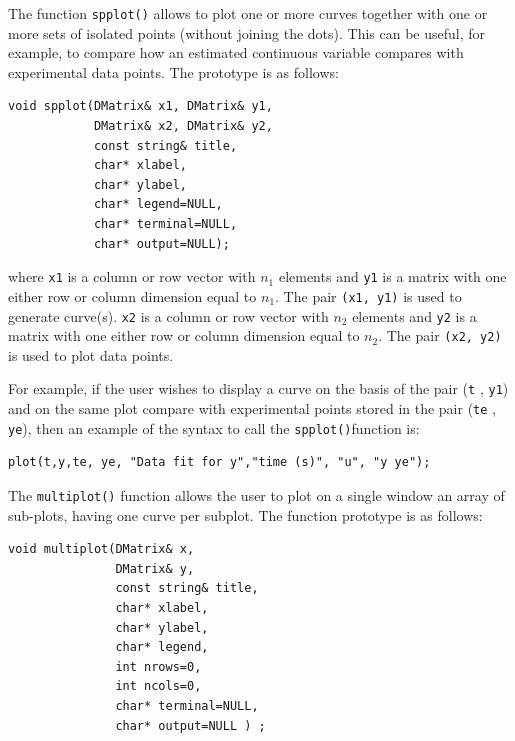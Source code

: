 \documentclass[a4paper,11pt]{report}    %
\newenvironment{shadedframe}{%
  \def\FrameCommand{\fcolorbox{black}{shadecolor}}%
  \MakeFramed {\FrameRestore}}
{\endMakeFramed}
\begin{document}
The function \texttt{spplot()} allows to plot one or more curves together with one or more sets of isolated points (without joining the dots). This can be useful, for example, to compare how an estimated continuous variable compares with experimental data points. The prototype is as follows:

\begin{verbatim}
void spplot(DMatrix& x1, DMatrix& y1,
            DMatrix& x2, DMatrix& y2,
            const string& title, 
            char* xlabel, 
            char* ylabel, 
            char* legend=NULL, 
            char* terminal=NULL, 
            char* output=NULL);
\end{verbatim}

\noindent where \texttt{x1} is a column or row vector with $n_1$ elements and \texttt{y1} is a matrix with 
one either row or column dimension equal to $n_1$. The pair \texttt{(x1, y1)} is used to generate curve(s). 
\texttt{x2} is a column or row vector with $n_2$ elements and \texttt{y2} is a matrix with 
one either row or column dimension equal to $n_2$. The pair \texttt{(x2, y2)} is used to plot data points.

\begin{shadedframe}

For example, if the user wishes to display a curve on the basis of the pair (\texttt{t} , \texttt{y1}) and on the same plot compare with experimental points stored in the pair (\texttt{te} , \texttt{ye}),  
then an example of the syntax to call the \texttt{spplot()}function is:

\begin{verbatim}
plot(t,y,te, ye, "Data fit for y","time (s)", "u", "y ye");
\end{verbatim}

\end{shadedframe}




The \texttt{multiplot()} function allows the user to plot on a single window an array of sub-plots, having
one curve per subplot. The function prototype is as follows:

\begin{verbatim}
void multiplot(DMatrix& x, 
               DMatrix& y, 
               const string& title, 
               char* xlabel, 
               char* ylabel, 
               char* legend, 
               int nrows=0, 
               int ncols=0,  
               char* terminal=NULL, 
               char* output=NULL ) ;
\end{verbatim}
\end{document}
